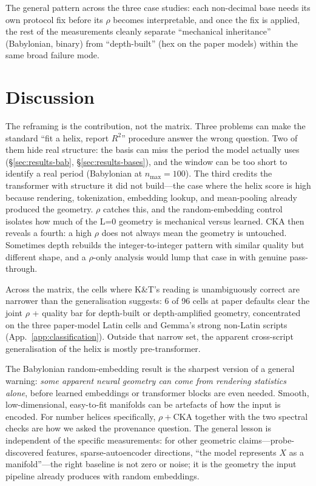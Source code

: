 \documentclass[10pt,letterpaper]{article}
\begin{document}
The general pattern across the three case studies: each non-decimal
base needs its own protocol fix before its $\rho$ becomes
interpretable, and once the fix is applied, the rest of the
measurements cleanly separate ``mechanical inheritance'' (Babylonian,
binary) from ``depth-built'' (hex on the paper models) within the
same broad failure mode.

\section{Discussion}
\label{sec:discussion}

The reframing is the contribution, not the matrix. Three problems
can make the standard ``fit a helix, report $R^2$'' procedure answer
the wrong question. Two of them hide real structure: the basis can
miss the period the model actually uses (\S\ref{sec:results-bab},
\S\ref{sec:results-bases}), and the window can be too short to
identify a real period (Babylonian at $n_{\max} = 100$). The third
credits the transformer with structure it did not build---the case
where the helix score is high because rendering, tokenization,
embedding lookup, and mean-pooling already produced the geometry.
$\rho$ catches this, and the random-embedding control isolates how
much of the L=0 geometry is mechanical versus learned. CKA then
reveals a fourth: a high $\rho$ does not always mean the geometry
is untouched. Sometimes depth rebuilds the integer-to-integer
pattern with similar quality but different shape, and a $\rho$-only
analysis would lump that case in with genuine pass-through.

Across the matrix, the cells where K\&T's reading is unambiguously
correct are narrower than the generalisation suggests: 6 of 96 cells
at paper defaults clear the joint $\rho$ + quality bar for
depth-built or depth-amplified geometry, concentrated on the three
paper-model Latin cells and Gemma's strong non-Latin scripts
(App.~\ref{app:classification}). Outside that narrow set, the
apparent cross-script generalisation of the helix is mostly
pre-transformer.

The Babylonian random-embedding result is the sharpest version of a
general warning: \emph{some apparent neural geometry can come from
rendering statistics alone}, before learned embeddings or
transformer blocks are even needed. Smooth,
low-dimensional, easy-to-fit manifolds can be artefacts of how the
input is encoded. For number helices specifically, $\rho + \text{CKA}$ together with
the two spectral checks are how we asked the provenance question.
The general lesson is independent of the specific measurements: for
other geometric claims---probe-discovered features,
sparse-autoencoder directions, ``the model represents $X$ as a
manifold''---the right baseline is not zero or noise; it is the
geometry the input pipeline already produces with random embeddings.
\end{document}
